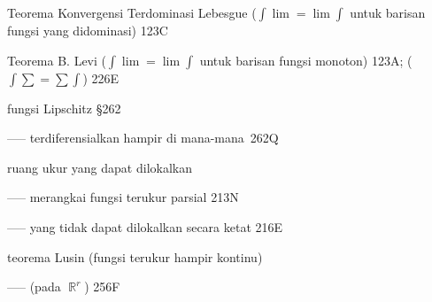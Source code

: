 Teorema Konvergensi Terdominasi Lebesgue ($\int\lim=\lim\int$
untuk barisan fungsi yang didominasi) 123C

 Teorema B. Levi ($\int\lim=\lim\int$ untuk barisan fungsi monoton) 123A; ($\int\sum=\sum\int$) 226E





















 fungsi Lipschitz \S262

----- terdiferensialkan hampir di mana-mana\ 262Q

 ruang ukur yang dapat dilokalkan

----- merangkai fungsi terukur parsial 213N

----- yang tidak dapat dilokalkan secara ketat 216E

























teorema Lusin (fungsi terukur hampir kontinu)


----- (pada $\BbbR^r$) 256F





\indexmedskip














































